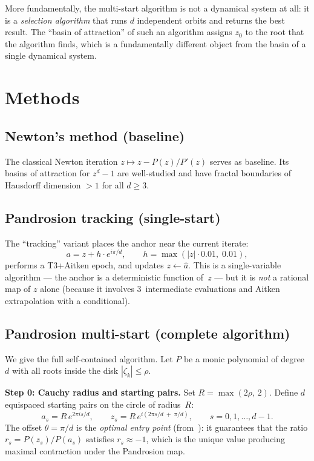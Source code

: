 \documentclass[10pt,a4paper,oneside]{book}
\theoremstyle{definition}
\theoremstyle{remark}
\begin{document}
More fundamentally, the multi-start algorithm is not a dynamical system at all: it is a \emph{selection algorithm} that runs $d$ independent orbits and returns the best result.  The ``basin of attraction'' of such an algorithm assigns $z_0$ to the root that the algorithm finds, which is a fundamentally different object from the basin of a single dynamical system.

\section{Methods}
\label{sec:methods}

\subsection{Newton's method (baseline)}

The classical Newton iteration $z \mapsto z - P(z)/P'(z)$ serves as baseline.  Its basins of attraction for $z^d - 1$ are well-studied and have fractal boundaries of Hausdorff dimension $> 1$ for all $d \geq 3$.

\subsection{Pandrosion tracking (single-start)}

The ``tracking'' variant places the anchor near the current iterate:
\[
a = z + h \cdot e^{i\pi/d}, \qquad h = \max(|z| \cdot 0.01,\; 0.01),
\]
performs a T3+Aitken epoch, and updates $z \leftarrow \hat{a}$.  This is a single-variable algorithm --- the anchor is a deterministic function of~$z$ --- but it is \emph{not} a rational map of $z$ alone (because it involves 3~intermediate evaluations and Aitken extrapolation with a conditional).

\subsection{Pandrosion multi-start (complete algorithm)}
\label{sec:multistart}

We give the full self-contained algorithm.  Let $P$ be a monic polynomial of degree~$d$ with all roots inside the disk $|\zeta_k| \leq \rho$.

\medskip
\noindent\textbf{Step 0: Cauchy radius and starting pairs.}  Set $R = \max(2\rho,\, 2)$.  Define $d$ equispaced starting pairs on the circle of radius~$R$:
\[
  a_s = R\,e^{2\pi i s/d}, \qquad
  z_s = R\,e^{i(2\pi s/d \;+\; \pi/d)},
  \qquad s = 0, 1, \ldots, d-1.
\]
The offset $\theta = \pi/d$ is the \emph{optimal entry point} (from~\cite{Besevic2026a}): it guarantees that the ratio $r_s = P(z_s)/P(a_s)$ satisfies $r_s \approx -1$, which is the unique value producing maximal contraction under the Pandrosion map.
\end{document}
